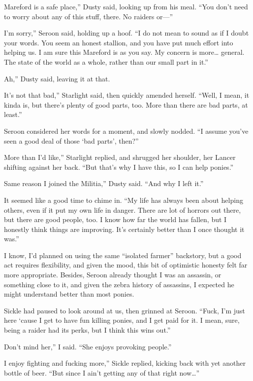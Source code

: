 \leavevmode{}Mareford is a safe place,” Dusty said, looking up from his meal. “You don’t need to worry about any of this stuff, there. No raiders or—”

\leavevmode{}I’m sorry,” Seroon said, holding up a hoof. “I do not mean to sound as if I doubt your words. You seem an honest stallion, and you have put much effort into helping us. I am sure this Mareford is as you say. My concern is more… general. The state of the world as a whole, rather than our small part in it.”

\leavevmode{}Ah,” Dusty said, leaving it at that.

\leavevmode{}It’s not that bad,” Starlight said, then quickly amended herself. “Well, I mean, it kinda is, but there’s plenty of good parts, too. More than there are bad parts, at least.”

Seroon considered her words for a moment, and slowly nodded. “I assume you’ve seen a good deal of those ‘bad parts’, then?”

\leavevmode{}More than I’d like,” Starlight replied, and shrugged her shoulder, her Lancer shifting against her back. “But that’s why I have this, so I can help ponies.”

\leavevmode{}Same reason I joined the Militia,” Dusty said. “And why I left it.”

It seemed like a good time to chime in. “My life has always been about helping others, even if it put my own life in danger. There are lot of horrors out there, but there are good people, too. I know how far the world has fallen, but I honestly think things are improving. It’s certainly better than I once thought it was.”

I know, I’d planned on using the same “isolated farmer” backstory, but a good act requires flexibility, and given the mood, this bit of optimistic honesty felt far more appropriate. Besides, Seroon already thought I was an assassin, or something close to it, and given the zebra history of assassins, I expected he might understand better than most ponies.

Sickle had paused to look around at us, then grinned at Seroon. “Fuck, I’m just here ‘cause I get to have fun killing ponies, and I get paid for it. I mean, sure, being a raider had its perks, but I think this wins out.”

\leavevmode{}Don’t mind her,” I said. “She enjoys provoking people.”

\leavevmode{}I enjoy fighting and fucking more,” Sickle replied, kicking back with yet another bottle of beer. “But since I ain’t getting any of that right now…”

